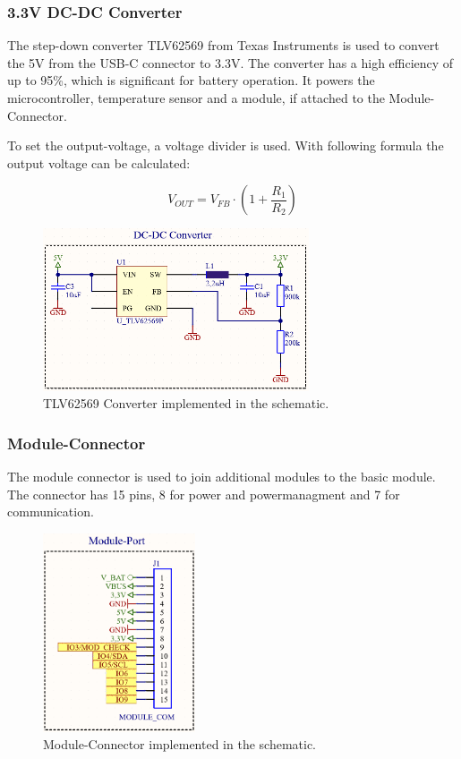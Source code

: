     \subsubsection{3.3V DC-DC Converter}

    The  step-down converter TLV62569 from Texas Instruments is used to convert 
    the 5V from the USB-C connector to 3.3V. The converter has a high efficiency
    of up to 95\%, which is significant for battery operation. It powers the
    microcontroller, temperature sensor and a module, if attached to the
    Module-Connector.

    To set the output-voltage, a voltage divider is used. With following formula
    the output voltage can be calculated:

    \begin{equation}
        V_{OUT} = V_{FB} \cdot (1 + \frac{R_1}{R_2})
    \end{equation}

    \begin{figure}[H]
        \centering
        \includegraphics[width=0.7\textwidth]{assets/HW/DC-DC-schematic.png}
        \caption{TLV62569 Converter implemented in the schematic.}
    \end{figure}

    \subsubsection{Module-Connector}

    The module connector is used to join additional modules to the basic module.
    The connector has 15 pins, 8 for power and powermanagment and 7 for 
    communication. 

    \begin{figure}[H]
        \centering
        \includegraphics[width=0.4\textwidth]{assets/HW/Module-Connector-schematic.png}
        \caption{Module-Connector implemented in the schematic.}
    \end{figure}

